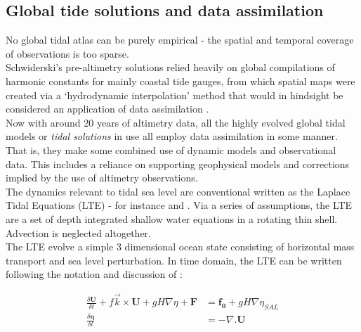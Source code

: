 \subsection{Global tide solutions and data assimilation}

No global tidal atlas can be purely empirical - the spatial and temporal coverage of observations is too sparse.\\
Schwiderski's pre-altimetry solutions relied heavily on global compilations of harmonic constants for mainly coastal tide gauges, from which spatial maps were created via a `hydrodynamic interpolation' method that would in hindsight be considered an application of data assimilation \cite[pp822]{Egbert:1994wz}.\\
Now with around 20 years of altimetry data, all the highly evolved global tidal models or \emph{tidal solutions} in use all employ data assimilation in some manner.  That is, they make some combined use of dynamic models and observational data.  This includes a reliance on supporting geophysical models and corrections implied by the use of altimetry observations.\\



The dynamics relevant to tidal sea level are conventional written as the Laplace Tidal Equations (LTE) - for instance \cite[9.8]{gill1982atmosphere} and \cite{Hendershott:1981ub}.   
Via a series of assumptions, the LTE are a set of depth integrated shallow water equations in a rotating thin shell.  Advection is neglected altogether.\\
The LTE evolve a simple 3 dimensional ocean state consisting of horizontal mass transport and sea level perturbation. In time domain, the LTE can be written following the notation and discussion of \cite[pp185]{Egbert:2002ug}:

\begin{align}
\label{E:LTE_momtm}
\frac{\delta \mathbf{U} }{ \delta t} + f\vec{k} \times \mathbf{U} + gH\nabla \eta  + \mathbf{F} &= \mathbf{f_0} + gH \nabla \eta_{SAL} \\
\label{E:LTE_cont}
\frac{\delta \mathbf{\eta} }{\delta t} &= -\nabla.\mathbf{U} 
\end{align}

